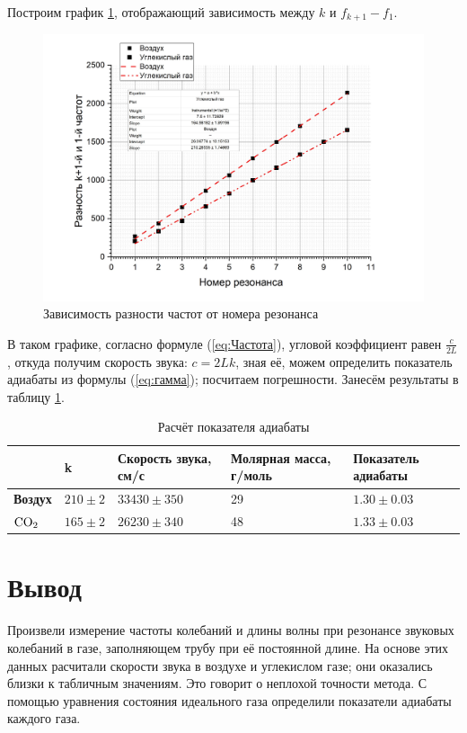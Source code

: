 \documentclass[a4paper]{article}
\begin{document}
Построим график \ref{fig:Разность}, отображающий зависимость между $k$ и $f_{k+1}-f_1$.
\begin{figure}[p]
	\centering
		\includegraphics[width=1.00\textwidth]{2.jpg}
	\caption{Зависимость разности частот от номера резонанса}
	\label{fig:Разность}
\end{figure}
В таком графике, согласно формуле (\ref{eq:Частота}), угловой коэффициент равен $\frac{c}{2 L}$, откуда получим скорость звука: $c = 2 L k$, зная её, можем определить показатель адиабаты из формулы (\ref{eq:гамма}); посчитаем погрешности. Занесём результаты в таблицу \ref{tab:РасчётПоказателяАдиабаты}.

\begin{table}[h]
	\centering
\begin{tabular}{|l|l|l|l|l|}
\hline
                     & \textbf{k}  & \textbf{Скорость звука, см/с} & \textbf{Молярная масса, г/моль} & \textbf{Показатель адиабаты} \\ \hline
\textbf{Воздух}      & $210 \pm 2$ & $33430 \pm 350$               & 29                              & $1.30 \pm 0.03$              \\ \hline
{$\bf \rm C O_2$} & $165 \pm 2$ & $26230 \pm 340$               & 48                              & $1.33 \pm 0.03$              \\ \hline
\end{tabular}
	\caption{Расчёт показателя адиабаты}
	\label{tab:РасчётПоказателяАдиабаты}
\end{table}

\section{Вывод}
Произвели измерение частоты колебаний и длины волны при резонансе звуковых колебаний в газе, заполняющем трубу при её постоянной длине. На основе этих данных расчитали скорости звука в воздухе и углекислом газе; они оказались близки к табличным значениям. Это говорит о неплохой точности метода. С помощью уравнения состояния идеального газа определили показатели адиабаты каждого газа.
\end{document}
